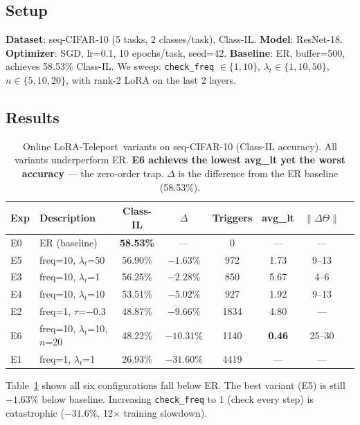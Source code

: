 \documentclass{article}
\newcommand{\method}{LoRA-Teleport}
\begin{document}
\subsection{Setup}

\textbf{Dataset}: seq-CIFAR-10 (5 tasks, 2 classes/task), Class-IL.
\textbf{Model}: ResNet-18. \textbf{Optimizer}: SGD, lr=0.1, 10 epochs/task, seed=42.
\textbf{Baseline}: ER, buffer=500, achieves 58.53\% Class-IL.
We sweep: \texttt{check\_freq} $\in \{1, 10\}$,
$\lambda_t \in \{1, 10, 50\}$,
$n \in \{5, 10, 20\}$, with rank-2 LoRA on the last 2 layers.

\subsection{Results}

\begin{table}[t]
\centering
\caption{Online \method\ variants on seq-CIFAR-10 (Class-IL accuracy).
         All variants underperform ER.
         \textbf{E6 achieves the lowest avg\_lt yet the worst accuracy} --- the zero-order trap.
         $\Delta$ is the difference from the ER baseline (58.53\%).}
\label{tab:h7}
\setlength{\tabcolsep}{5pt}
\begin{tabular}{llcccccc}
\toprule
Exp & Description & Class-IL & $\Delta$ & Triggers & avg\_lt & $\|\Delta\Theta\|$ \\
\midrule
E0 & ER (baseline)            & \textbf{58.53\%} & --- & 0    & ---  & ---   \\
\midrule
E5 & freq=10, $\lambda_t$=50  & 56.90\%          & $-1.63\%$  & 972  & 1.73 & 9--13 \\
E3 & freq=10, $\lambda_t$=1   & 56.25\%          & $-2.28\%$  & 850  & 5.67 & 4--6  \\
E4 & freq=10, $\lambda_t$=10  & 53.51\%          & $-5.02\%$  & 927  & 1.92 & 9--13 \\
E2 & freq=1,  $\tau$=$-0.3$   & 48.87\%          & $-9.66\%$  & 1834 & 4.80 & ---   \\
E6 & freq=10, $\lambda_t$=10, $n$=20 & 48.22\%   & $-10.31\%$ & 1140 & \textbf{0.46} & 25--30 \\
E1 & freq=1,  $\lambda_t$=1   & 26.93\%          & $-31.60\%$ & 4419 & ---  & ---   \\
\bottomrule
\end{tabular}
\end{table}

Table~\ref{tab:h7} shows all six configurations fall below ER.
The best variant (E5) is still $-1.63\%$ below baseline.
Increasing \texttt{check\_freq} to 1 (check every step) is catastrophic
($-31.6\%$, 12$\times$ training slowdown).
\end{document}
